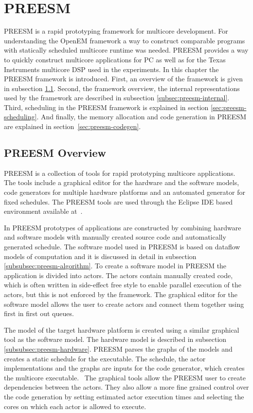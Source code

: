 \section{PREESM}
\label{sec:preesm}
PREESM is a rapid prototyping framework for multicore development. For understanding the OpenEM framework a way to construct comparable programs with statically scheduled multicore runtime was needed. PREESM provides a way to quickly construct multicore applications for PC as well as for the Texas Instruments multicore DSP used in the experiments. In this chapter the PREESM framework is introduced. First, an overview of the framework is given in subsection \ref{subsec:preesm-overview}. Second, the framework overview, the internal representations used by the framework are described in subsection \ref{subsec:preesm-internal}. Third, scheduling in the PREESM framework is explained in section \ref{sec:preesm-scheduling}. And finally, the memory allocation and code generation in PREESM are explained in section~\ref{sec:preesm-codegen}.

\subsection{PREESM Overview}
\label{subsec:preesm-overview}
PREESM is a collection of tools for rapid prototyping multicore applications. The tools include a graphical editor for the hardware and the software models, code generators for multiple hardware platforms and an automated generator for fixed schedules. The PREESM tools are used through the Eclipse IDE based environment available at~\cite{preesm}.

In PREESM prototypes of applications are constructed by combining hardware and software models with manually created source code and automatically generated schedule. The software model used in PREESM is based on dataflow models of computation and it is discussed in detail in subsection \ref{subsubsec:preesm-algorithm}. To create a software model in PREESM the application is divided into actors. The actors contain manually created code, which is often written in side-effect free style to enable parallel execution of the actors, but this is not enforced by the framework. The graphical editor for the software model allows the user to create actors and connect them together using first in first out queues.~\cite{preesm}

The model of the target hardware platform is created using a similar graphical tool as the software model. The hardware model is described in subsection \ref{subsubsec:preesm-hardware}. PREESM parses the graphs of the models and creates a static schedule for the executable. The schedule, the actor implementations and the graphs are inputs for the code generator, which creates the multicore executable.~\cite{pelcat2014preesm} The graphical tools allow the PREESM user to create dependencies between the actors. They also allow a more fine grained control over the code generation by setting estimated actor execution times and selecting the cores on which each actor is allowed to execute.

